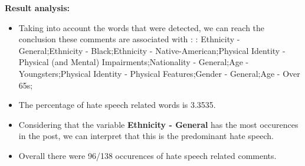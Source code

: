 \documentclass[11pt]{article}
\begin{document}
\textbf{\Large Result analysis:}

\begin{itemize}\item Taking into account the words that were detected, we can reach the conclusion these comments are associated with : : Ethnicity - General;Ethnicity - Black;Ethnicity - Native-American;Physical Identity - Physical (and Mental) Impairments;Nationality - General;Age - Youngsters;Physical Identity - Physical Features;Gender - General;Age - Over 65s;%

\item The percentage of hate speech related words is 3.3535.

\item Considering that the variable \textbf{Ethnicity - General} has the most occurences in the post, we can interpret that this is the predominant hate speech.

\item Overall there were 96/138 occurences of hate speech related comments.\end{itemize}
\end{document}
